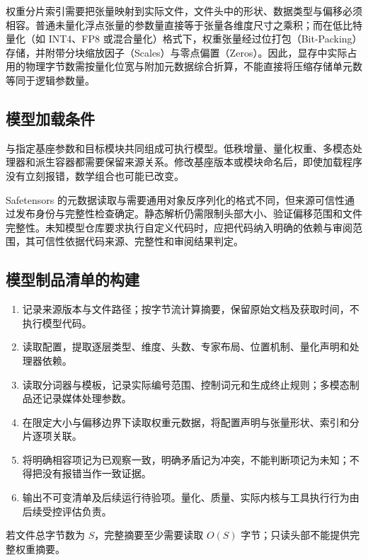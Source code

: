 \documentclass[../textbook.tex]{subfiles}
\begin{document}
权重分片索引需要把张量映射到实际文件，文件头中的形状、数据类型与偏移必须相容。普通未量化浮点张量的参数量直接等于张量各维度尺寸之乘积；而在低比特量化（如 INT4、FP8 或混合量化）格式下，权重张量经过位打包（Bit-Packing）存储，并附带分块缩放因子（Scales）与零点偏置（Zeros）。因此，显存中实际占用的物理字节数需按量化位宽与附加元数据综合折算，不能直接将压缩存储单元数等同于逻辑参数量。

\subsection{模型加载条件}
与指定基座参数和目标模块共同组成可执行模型。低秩增量、量化权重、多模态处理器和派生容器都需要保留来源关系。修改基座版本或模块命名后，即使加载程序没有立刻报错，数学组合也可能已改变。

Safetensors 的元数据读取与需要通用对象反序列化的格式不同，但来源可信性通过发布身份与完整性检查确定。静态解析仍需限制头部大小、验证偏移范围和文件完整性。未知模型仓库要求执行自定义代码时，应把代码纳入明确的依赖与审阅范围，其可信性依据代码来源、完整性和审阅结果判定。

\subsection{模型制品清单的构建}
\begin{algorithm}[建立模型结构与协议清单]
\label{alg:open-manifest}
\begin{enumerate}
\item 记录来源版本与文件路径；按字节流计算摘要，保留原始文档及获取时间，不执行模型代码。
\item 读取配置，提取逐层类型、维度、头数、专家布局、位置机制、量化声明和处理器依赖。
\item 读取分词器与模板，记录实际编号范围、控制词元和生成终止规则；多模态制品还记录媒体处理参数。
\item 在限定大小与偏移边界下读取权重元数据，将配置声明与张量形状、索引和分片逐项关联。
\item 将明确相容项记为已观察一致，明确矛盾记为冲突，不能判断项记为未知；不得把没有报错当作一致证据。
\item 输出不可变清单及后续运行待验项。量化、质量、实际内核与工具执行行为由后续受控评估负责。
\end{enumerate}
若文件总字节数为 $S$，完整摘要至少需要读取 $O(S)$ 字节；只读头部不能提供完整权重摘要。
\end{algorithm}
\end{document}
